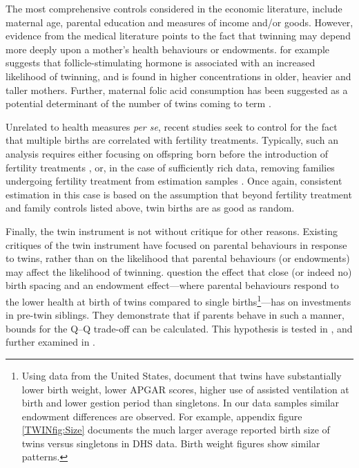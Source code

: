 \documentclass[subeqn]{article}
\begin{document}
\begin{spacing}{1.4}
The most comprehensive controls considered in the economic literature, include
maternal age, parental education and measures of income and/or goods.  However,
evidence from the medical literature points to the fact that twinning may
depend more deeply upon a mother's health behaviours or endowments. \citet{Hall2003}
for example suggests that follicle-stimulating hormone is associated with
an increased likelihood of twinning, and is found in higher concentrations in
older, heavier and taller mothers. Further, maternal folic acid consumption
has been suggested as a potential determinant of the number of twins coming to
term \citet{Lietal2003}.

Unrelated to health measures \emph{per se}, recent studies seek to control for 
the fact that multiple births are correlated with fertility treatments. 
Typically, such an analysis requires either focusing on offspring born before
the introduction of fertility treatments \citep{Caceres2006,Angristetal2010}, 
or, in the case of sufficiently rich data, removing families undergoing fertility 
treatment from estimation samples \citep{Braakman2014}. Once again, consistent 
estimation in this case is based on the assumption that beyond fertility 
treatment and family controls listed above, twin births are as good as random.

Finally, the twin instrument is not without critique for other reasons. Existing
critiques of the twin instrument have focused on parental behaviours in response 
to twins, rather than on the likelihood that parental behaviours (or endowments) 
may affect the likelihood of twinning. \citet{RosenzweigZhang2009} question the 
effect that close (or indeed no) birth spacing and an endowment effect---where 
parental behaviours respond to the lower health at birth of twins compared to 
single births\footnote{Using data from the United States, \citet{Almondetal2005} 
document that twins have substantially lower birth weight, lower APGAR scores, 
higher use of assisted ventilation at birth and lower gestion period than 
singletons. In our data samples similar endowment differences are observed. For
example, appendix figure \ref{TWINfig:Size} documents the much larger average 
reported birth size of twins versus singletons in DHS data. Birth weight figures 
show similar patterns.}---has on investments in pre-twin siblings. They 
demonstrate that if parents behave in such a manner, bounds for the Q--Q 
trade-off can be calculated. This hypothesis is tested in 
\citet{Angristetal2010}, and further examined in \citet{FitzsimonsMalde2014}. 



\end{spacing}
\end{document}
